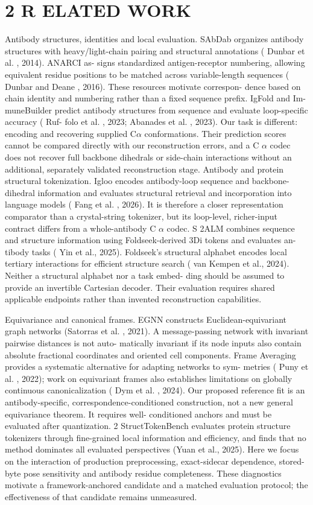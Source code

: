 \documentclass[11pt]{article}
\begin{document}
\section*{2 R ELATED WORK}

Antibody structures, identities and local evaluation. SAbDab organizes antibody structures
with heavy/light-chain pairing and structural annotations ( Dunbar et al. , 2014). ANARCI as-
signs standardized antigen-receptor numbering, allowing equivalent residue positions to be matched
across variable-length sequences ( Dunbar and Deane , 2016). These resources motivate correspon-
dence based on chain identity and numbering rather than a fixed sequence prefix. IgFold and Im-
muneBuilder predict antibody structures from sequence and evaluate loop-specific accuracy ( Ruf-
folo et al. , 2023; Abanades et al. , 2023). Our task is different: encoding and recovering supplied
C\ensuremath{\alpha} conformations. Their prediction scores cannot be compared directly with our reconstruction
errors, and a C \ensuremath{\alpha} codec does not recover full backbone dihedrals or side-chain interactions without
an additional, separately validated reconstruction stage.
Antibody and protein structural tokenization. Igloo encodes antibody-loop sequence and
backbone-dihedral information and evaluates structural retrieval and incorporation into language
models ( Fang et al. , 2026). It is therefore a closer representation comparator than a crystal-string
tokenizer, but its loop-level, richer-input contract differs from a whole-antibody C \ensuremath{\alpha} codec. S 2ALM
combines sequence and structure information using Foldseek-derived 3Di tokens and evaluates an-
tibody tasks ( Yin et al., 2025). Foldseek’s structural alphabet encodes local tertiary interactions for
efficient structure search ( van Kempen et al., 2024). Neither a structural alphabet nor a task embed-
ding should be assumed to provide an invertible Cartesian decoder. Their evaluation requires shared
applicable endpoints rather than invented reconstruction capabilities.

Equivariance and canonical frames. EGNN constructs Euclidean-equivariant graph networks
(Satorras et al. , 2021). A message-passing network with invariant pairwise distances is not auto-
matically invariant if its node inputs also contain absolute fractional coordinates and oriented cell
components. Frame Averaging provides a systematic alternative for adapting networks to sym-
metries ( Puny et al. , 2022); work on equivariant frames also establishes limitations on globally
continuous canonicalization ( Dym et al. , 2024). Our proposed reference fit is an antibody-specific,
correspondence-conditioned construction, not a new general equivariance theorem. It requires well-
conditioned anchors and must be evaluated after quantization.
2
StructTokenBench evaluates protein structure tokenizers through fine-grained local information
and efficiency, and finds that no method dominates all evaluated perspectives (Yuan et al., 2025).
Here we focus on the interaction of production preprocessing, exact-sidecar dependence,
stored-byte pose sensitivity and antibody residue completeness. These diagnostics motivate a
framework-anchored candidate and a matched evaluation protocol; the effectiveness of that
candidate remains unmeasured.
\end{document}
